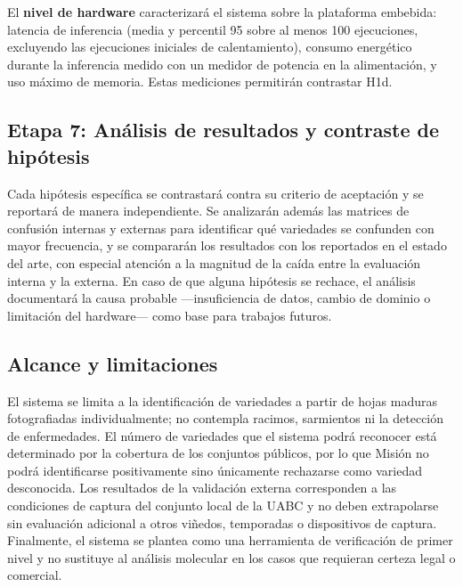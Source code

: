 El \textbf{nivel de hardware} caracterizará el sistema sobre la plataforma
embebida: latencia de inferencia (media y percentil 95 sobre al menos 100
ejecuciones, excluyendo las ejecuciones iniciales de calentamiento),
consumo energético durante la inferencia medido con un medidor de
potencia en la alimentación, y uso máximo de memoria. Estas mediciones
permitirán contrastar H1d.

\subsection{Etapa 7: Análisis de resultados y contraste de hipótesis}

Cada hipótesis específica se contrastará contra su criterio de aceptación y
se reportará de manera independiente. Se analizarán además las matrices de
confusión internas y externas para identificar qué variedades se confunden
con mayor frecuencia, y se compararán los resultados con los reportados en
el estado del arte, con especial atención a la magnitud de la caída entre
la evaluación interna y la externa. En caso de que alguna hipótesis se
rechace, el análisis documentará la causa probable —insuficiencia de datos,
cambio de dominio o limitación del hardware— como base para trabajos
futuros.

\subsection{Alcance y limitaciones}

El sistema se limita a la identificación de variedades a partir de hojas
maduras fotografiadas individualmente; no contempla racimos, sarmientos ni
la detección de enfermedades. El número de variedades que el sistema podrá
reconocer está determinado por la cobertura de los conjuntos públicos, por
lo que Misión no podrá identificarse positivamente sino únicamente
rechazarse como variedad desconocida. Los resultados de la validación
externa corresponden a las condiciones de captura del conjunto local de la
UABC y no deben extrapolarse sin evaluación adicional a otros viñedos,
temporadas o dispositivos de captura. Finalmente, el sistema se plantea como
una herramienta de verificación de primer nivel y no sustituye al análisis
molecular en los casos que requieran certeza legal o comercial.
